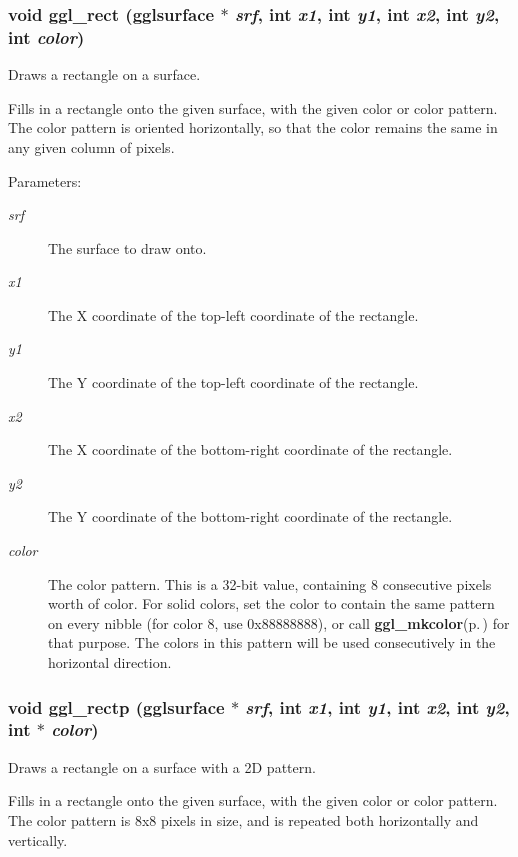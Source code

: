 \subsubsection{\setlength{\rightskip}{0pt plus 5cm}void ggl\_\-rect ({\bf gglsurface} $\ast$ {\em srf}, int {\em x1}, int {\em y1}, int {\em x2}, int {\em y2}, int {\em color})}\label{ggl_8h_a17}


Draws a rectangle on a surface. 

Fills in a rectangle onto the given surface, with the given color or color pattern. The color pattern is oriented horizontally, so that the color remains the same in any given column of pixels.

\begin{Desc}
\item[Parameters:]
\begin{description}
\item[{\em srf}]The surface to draw onto. \item[{\em x1}]The X coordinate of the top-left coordinate of the rectangle. \item[{\em y1}]The Y coordinate of the top-left coordinate of the rectangle. \item[{\em x2}]The X coordinate of the bottom-right coordinate of the rectangle. \item[{\em y2}]The Y coordinate of the bottom-right coordinate of the rectangle. \item[{\em color}]The color pattern. This is a 32-bit value, containing 8 consecutive pixels worth of color. For solid colors, set the color to contain the same pattern on every nibble (for color 8, use 0x88888888), or call {\bf ggl\_\-mkcolor}{\rm (p.\,\pageref{ggl_8h_a32})} for that purpose. The colors in this pattern will be used consecutively in the horizontal direction. \end{description}
\end{Desc}
\subsubsection{\setlength{\rightskip}{0pt plus 5cm}void ggl\_\-rectp ({\bf gglsurface} $\ast$ {\em srf}, int {\em x1}, int {\em y1}, int {\em x2}, int {\em y2}, int $\ast$ {\em color})}\label{ggl_8h_a18}


Draws a rectangle on a surface with a 2D pattern. 

Fills in a rectangle onto the given surface, with the given color or color pattern. The color pattern is 8x8 pixels in size, and is repeated both horizontally and vertically.

